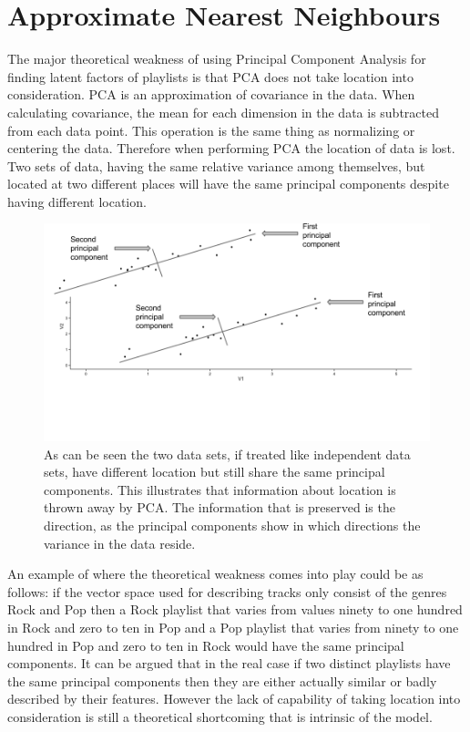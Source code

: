 \documentclass[a4paper,11pt]{kth-mag}
\begin{document}
\section{Approximate Nearest Neighbours}
The major theoretical weakness of using Principal Component Analysis for finding latent factors of playlists is that PCA does not take location into consideration. PCA is an approximation of covariance in the data. When calculating covariance, the mean for each dimension in the data is subtracted from each data point. This operation is the same thing as normalizing or centering the data. Therefore when performing PCA the location of data is lost. Two sets of data, having the same relative variance among themselves, but located at two different places will have the same principal components despite having different location.

\begin{figure}
\centering
\includegraphics[width=.98\textwidth]{images/pcaNormalize.png}
\caption{As can be seen the two data sets, if treated like independent data sets, have different location but still share the same principal components. This illustrates that information about location is thrown away by PCA. The information that is preserved is the direction, as the principal components show in which directions the variance in the data reside.}
\end{figure}



 An example of where the theoretical weakness comes into play could be as follows: if the vector space used for describing tracks only consist of the genres Rock and Pop then a Rock playlist that varies from values ninety to one hundred in Rock and zero to ten in Pop and a Pop playlist that varies from ninety to one hundred in Pop and zero to ten in Rock would have the same principal components. It can be argued that in the real case if two distinct playlists have the same principal components then they are either actually similar or badly described by their features. However the lack of capability of taking location into consideration is still a theoretical shortcoming that is intrinsic of the model. 
 
\end{document}
